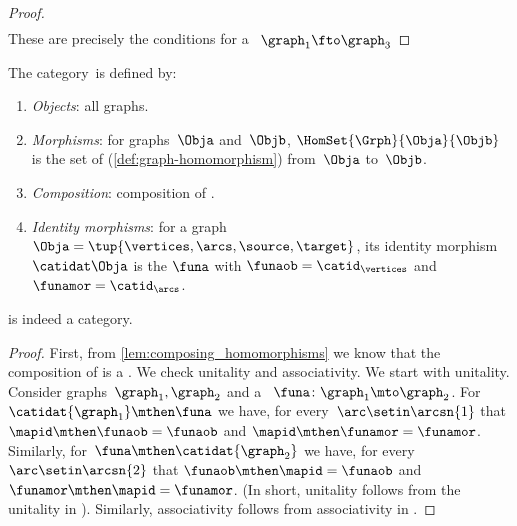 {\begin{proof}
\begin{equation}
\begin{aligned}
        \end{aligned}
    \end{equation}
    These are precisely the conditions for a ~$\graph_1 \fto \graph_3$
\end{proof}
\begin{ctdefinition}
    \label{def:Grph}
    The category~\Grph is defined by:
    \begin{enumerate}
        \item \emph{Objects}: all graphs.
        \item \emph{Morphisms}: for graphs~$\Obja$ and~$\Objb$, $\HomSet{\Grph}{\Obja}{\Objb}$ is the set of  (\cref{def:graph-homomorphism}) from~$\Obja$ to~$\Objb$.
        \item \emph{Composition}: composition of .
        \item \emph{Identity morphisms}: for a graph~$\Obja =\tup{\vertices,\arcs,\source,\target}$,
              its identity morphism $\catidat\Obja$ is the  $\funa$ with $\funaob = \catid_{\vertices}$ and $\funamor= \catid_{\arcs}$.
    \end{enumerate}
\end{ctdefinition}

\begin{lemma}\label{lem:Grph-is-cat}
    \Grph is indeed a category.
\end{lemma}

\begin{proof}
    First, from \cref{lem:composing_homomorphisms} we know that the composition of  is a .
    We check unitality and associativity.
    We start with unitality.
    Consider graphs~$\graph_1,\graph_2$ and a ~$\funa\colon \graph_1\mto \graph_2$.
    For~$\catidat{\graph_1}\mthen \funa$ we have, for every~$\arc \setin \arcsn{1}$ that $\mapid\mthen \funaob=\funaob$ and $\mapid\mthen \funamor=\funamor$.
    Similarly, for~$\funa \mthen \catidat{\graph_2}$ we have, for every $\arc \setin \arcsn{2}$ that $\funaob\mthen \mapid=\funaob$ and $\funamor \mthen \mapid=\funamor$.
    (In short, unitality follows from the unitality in \Set).
    Similarly, associativity follows from associativity in \Set.
\end{proof}

}
